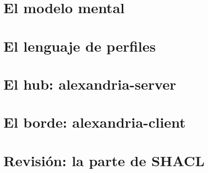 \documentclass[11pt,a4paper,openany,oneside]{book}
\begin{document}
\frontmatter
\setcounter{tocdepth}{1}
\tableofcontents

\mainmatter



\part{El modelo mental}


\part{El lenguaje de perfiles}







\part{El hub: alexandria-server}



\part{El borde: alexandria-client}





\part{Revisión: la parte de SHACL}


\appendix

\end{document}

